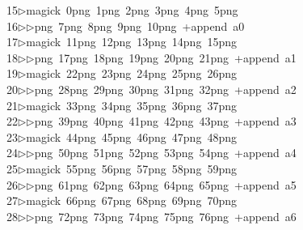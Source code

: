 \begin{tabbing}
15\>$\triangleright$\>magick\ 0png\ 1png\ 2png\ 3png\ 4png\ 5png\ \\[0pt]
16\>$\triangleright$\>$\triangleright$png\ 7png\ 8png\ 9png\ 10png\ +append\ a0\\[0pt]
17\>$\triangleright$\>magick\ 11png\ 12png\ 13png\ 14png\ 15png\ \\[0pt]
18\>$\triangleright$\>$\triangleright$png\ 17png\ 18png\ 19png\ 20png\ 21png\ +append\ a1\\[0pt]
19\>$\triangleright$\>magick\ 22png\ 23png\ 24png\ 25png\ 26png\ \\[0pt]
20\>$\triangleright$\>$\triangleright$png\ 28png\ 29png\ 30png\ 31png\ 32png\ +append\ a2\\[0pt]
21\>$\triangleright$\>magick\ 33png\ 34png\ 35png\ 36png\ 37png\ \\[0pt]
22\>$\triangleright$\>$\triangleright$png\ 39png\ 40png\ 41png\ 42png\ 43png\ +append\ a3\\[0pt]
23\>$\triangleright$\>magick\ 44png\ 45png\ 46png\ 47png\ 48png\ \\[0pt]
24\>$\triangleright$\>$\triangleright$png\ 50png\ 51png\ 52png\ 53png\ 54png\ +append\ a4\\[0pt]
25\>$\triangleright$\>magick\ 55png\ 56png\ 57png\ 58png\ 59png\ \\[0pt]
26\>$\triangleright$\>$\triangleright$png\ 61png\ 62png\ 63png\ 64png\ 65png\ +append\ a5\\[0pt]
27\>$\triangleright$\>magick\ 66png\ 67png\ 68png\ 69png\ 70png\ \\[0pt]
28\>$\triangleright$\>$\triangleright$png\ 72png\ 73png\ 74png\ 75png\ 76png\ +append\ a6\\[0pt]

\end{tabbing}
